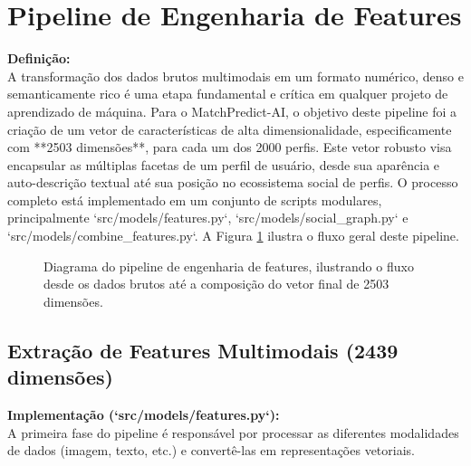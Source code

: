 \section{Pipeline de Engenharia de Features}
\label{sec:dev_pipeline_features}

\textbf{Definição:} \\
A transformação dos dados brutos multimodais em um formato numérico, denso e semanticamente rico é uma etapa fundamental e crítica em qualquer projeto de aprendizado de máquina. Para o MatchPredict-AI, o objetivo deste pipeline foi a criação de um vetor de características de alta dimensionalidade, especificamente com **2503 dimensões**, para cada um dos 2000 perfis. Este vetor robusto visa encapsular as múltiplas facetas de um perfil de usuário, desde sua aparência e auto-descrição textual até sua posição no ecossistema social de perfis. O processo completo está implementado em um conjunto de scripts modulares, principalmente `src/models/features.py`, `src/models/social_graph.py` e `src/models/combine_features.py`. A Figura \ref{fig:pipeline_dados_tcc2} ilustra o fluxo geral deste pipeline.

\begin{figure}[hbt]
    \centering
    \caption{Diagrama do pipeline de engenharia de features, ilustrando o fluxo desde os dados brutos até a composição do vetor final de 2503 dimensões.}
    \label{fig:pipeline_dados_tcc2}
\end{figure}

\subsection{Extração de Features Multimodais (2439 dimensões)}
\textbf{Implementação (`src/models/features.py`):} \\
A primeira fase do pipeline é responsável por processar as diferentes modalidades de dados (imagem, texto, etc.) e convertê-las em representações vetoriais.

